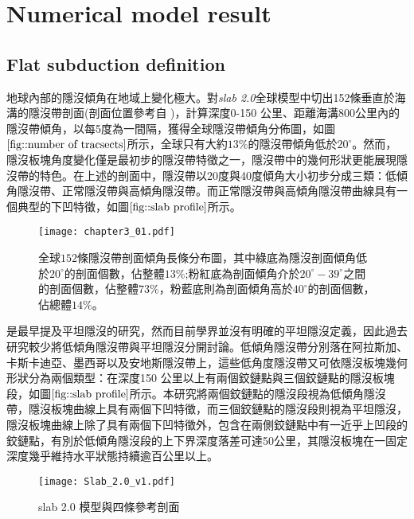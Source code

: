 
\chapter{Numerical model result}

\section{Flat subduction definition}


地球內部的隱沒傾角在地域上變化極大。對\emph{slab 2.0}全球模型中切出152條垂直於海溝的隱沒帶剖面(剖面位置參考自 \citealp{Hu2020})，計算深度0-150 公里、距離海溝800公里內的隱沒帶傾角，以每5度為一間隔，獲得全球隱沒帶傾角分佈圖，如圖$\ref{fig::number of tracsects}$所示，全球只有大約$13\%$的隱沒帶傾角低於$20^\circ$。然而，隱沒板塊角度變化僅是最初步的隱沒帶特徵之一，隱沒帶中的幾何形狀更能展現隱沒帶的特色。在上述的剖面中，隱沒帶以20度與40度傾角大小初步分成三類：低傾角隱沒帶、正常隱沒帶與高傾角隱沒帶。而正常隱沒帶與高傾角隱沒帶曲線具有一個典型的下凹特徵，如圖$\ref{fig::slab profile}$所示。

\begin{figure*}[ht!]
    \centering
    \texttt{[image: chapter3\_01.pdf]}
    \caption{全球$152$條隱沒帶剖面傾角長條分布圖，其中綠底為隱沒剖面傾角低於$20^\circ$的剖面個數，佔整體$13\%$;粉紅底為剖面傾角介於$20^\circ-39^\circ$之間的剖面個數，佔整體$73\%$，粉藍底則為剖面傾角高於$40^\circ$的剖面個數，佔總體$14\%$。}
    \label{fig::number of tracsects}
\end{figure*}

\citealp{barazangi1976}是最早提及平坦隱沒的研究，然而目前學界並沒有明確的平坦隱沒定義，因此過去研究較少將低傾角隱沒帶與平坦隱沒分開討論。低傾角隱沒帶分別落在阿拉斯加、卡斯卡迪亞、墨西哥以及安地斯隱沒帶上，這些低角度隱沒帶又可依隱沒板塊幾何形狀分為兩個類型：在深度150 公里以上有兩個鉸鏈點與三個鉸鏈點的隱沒板塊段，如圖$\ref{fig::slab profile}$所示。本研究將兩個鉸鏈點的隱沒段視為低傾角隱沒帶，隱沒板塊曲線上具有兩個下凹特徵，而三個鉸鏈點的隱沒段則視為平坦隱沒，隱沒板塊曲線上除了具有兩個下凹特徵外，包含在兩側鉸鏈點中有一近乎上凹段的鉸鏈點，有別於低傾角隱沒段的上下界深度落差可達50公里，其隱沒板塊在一固定深度幾乎維持水平狀態持續逾百公里以上。

\begin{figure*}[ht!]
    \centering
    \texttt{[image: Slab\_2.0\_v1.pdf]}
    \caption{slab 2.0 模型與四條參考剖面}
    \label{fig::slab profile}
\end{figure*}

